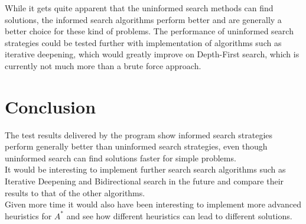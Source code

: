 \documentclass[journal]{IEEEtran}
\begin{document}
While it gets quite apparent that the uninformed search methods can find solutions, the informed search algorithms perform better and are generally a better choice for these kind of problems. The performance of uninformed search strategies could be tested further with implementation of algorithms such as iterative deepening, which would greatly improve on Depth-First search, which is currently not much more than a brute force approach.

\section{Conclusion}
The test results delivered by the program show informed search strategies perform generally better than uninformed search strategies, even though uninformed search can find solutions faster for simple problems. \\
It would be interesting to implement further search search algorithms such as Iterative Deepening and Bidirectional search in the future and compare their results to that of the other algorithms. \\
Given more time it would also have been interesting to implement more advanced heuristics for $A^*$ and see how different heuristics can lead to different solutions.




%








%
\end{document}
